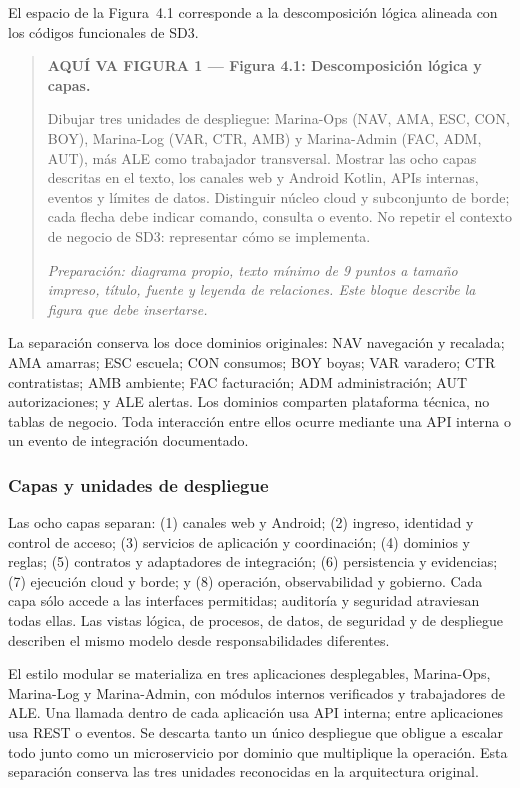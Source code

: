 \documentclass[11pt,letterpaper]{report}
\begin{document}
El espacio de la Figura~4.1 corresponde a la descomposición lógica alineada con los códigos funcionales de SD3.
\par\medskip
\begin{quote}\textbf{AQUÍ VA FIGURA 1 — Figura 4.1: Descomposición lógica y capas.}\par Dibujar tres unidades de despliegue: Marina-Ops (NAV, AMA, ESC, CON, BOY), Marina-Log (VAR, CTR, AMB) y Marina-Admin (FAC, ADM, AUT), más ALE como trabajador transversal. Mostrar las ocho capas descritas en el texto, los canales web y Android Kotlin, APIs internas, eventos y límites de datos. Distinguir núcleo cloud y subconjunto de borde; cada flecha debe indicar comando, consulta o evento. No repetir el contexto de negocio de SD3: representar cómo se implementa.\par\textit{Preparación: diagrama propio, texto mínimo de 9 puntos a tamaño impreso, título, fuente y leyenda de relaciones. Este bloque describe la figura que debe insertarse.}\end{quote}

La separación conserva los doce dominios originales: NAV navegación y recalada; AMA amarras; ESC escuela; CON consumos; BOY boyas; VAR varadero; CTR contratistas; AMB ambiente; FAC facturación; ADM administración; AUT autorizaciones; y ALE alertas. Los dominios comparten plataforma técnica, no tablas de negocio. Toda interacción entre ellos ocurre mediante una API interna o un evento de integración documentado.

\subsubsection*{Capas y unidades de despliegue}

Las ocho capas separan: (1) canales web y Android; (2) ingreso, identidad y control de acceso; (3) servicios de aplicación y coordinación; (4) dominios y reglas; (5) contratos y adaptadores de integración; (6) persistencia y evidencias; (7) ejecución cloud y borde; y (8) operación, observabilidad y gobierno. Cada capa sólo accede a las interfaces permitidas; auditoría y seguridad atraviesan todas ellas. Las vistas lógica, de procesos, de datos, de seguridad y de despliegue describen el mismo modelo desde responsabilidades diferentes.

El estilo modular se materializa en tres aplicaciones desplegables, Marina-Ops, Marina-Log y Marina-Admin, con módulos internos verificados y trabajadores de ALE. Una llamada dentro de cada aplicación usa API interna; entre aplicaciones usa REST o eventos. Se descarta tanto un único despliegue que obligue a escalar todo junto como un microservicio por dominio que multiplique la operación. Esta separación conserva las tres unidades reconocidas en la arquitectura original.
\end{document}
